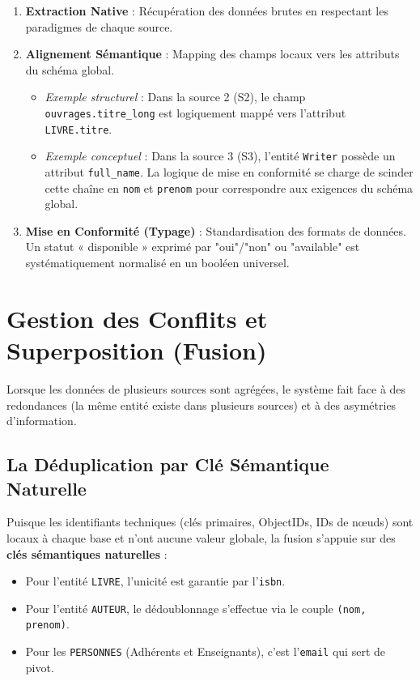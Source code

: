 \documentclass[12pt,a4paper]{article}
\begin{document}
\begin{enumerate}
    \item \textbf{Extraction Native} : Récupération des données brutes en respectant les paradigmes de chaque source.
    \item \textbf{Alignement Sémantique} : Mapping des champs locaux vers les attributs du schéma global.
    \begin{itemize}
        \item \textit{Exemple structurel} : Dans la source 2 (S2), le champ \texttt{ouvrages.titre\_long} est logiquement mappé vers l'attribut \texttt{LIVRE.titre}.
        \item \textit{Exemple conceptuel} : Dans la source 3 (S3), l'entité \texttt{Writer} possède un attribut \texttt{full\_name}. La logique de mise en conformité se charge de scinder cette chaîne en \texttt{nom} et \texttt{prenom} pour correspondre aux exigences du schéma global.
    \end{itemize}
    \item \textbf{Mise en Conformité (Typage)} : Standardisation des formats de données. Un statut « disponible » exprimé par "oui"/"non" ou "available" est systématiquement normalisé en un booléen universel.
\end{enumerate}

\section{Gestion des Conflits et Superposition (Fusion)}

Lorsque les données de plusieurs sources sont agrégées, le système fait face à des redondances (la même entité existe dans plusieurs sources) et à des asymétries d'information.

\subsection{La Déduplication par Clé Sémantique Naturelle}
Puisque les identifiants techniques (clés primaires, ObjectIDs, IDs de nœuds) sont locaux à chaque base et n'ont aucune valeur globale, la fusion s'appuie sur des \textbf{clés sémantiques naturelles} :
\begin{itemize}
    \item Pour l'entité \texttt{LIVRE}, l'unicité est garantie par l'\texttt{isbn}.
    \item Pour l'entité \texttt{AUTEUR}, le dédoublonnage s'effectue via le couple \texttt{(nom, prenom)}.
    \item Pour les \texttt{PERSONNES} (Adhérents et Enseignants), c'est l'\texttt{email} qui sert de pivot.
\end{itemize}
\end{document}
